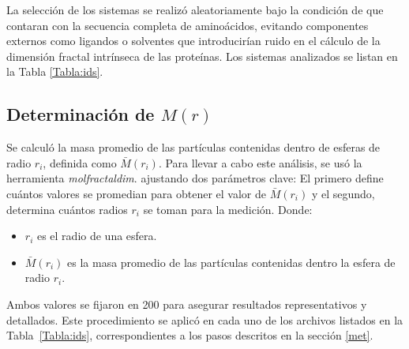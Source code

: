  	La selecci\'{o}n de los sistemas se realiz\'{o} aleatoriamente bajo la condici\'{o}n de que contaran con la secuencia completa de amino\'{a}cidos, evitando componentes externos como ligandos o solventes que introducir\'{i}an ruido en el c\'{a}lculo de la dimensi\'{o}n fractal intr\'{i}nseca de las prote\'{i}nas. Los sistemas analizados se listan en la Tabla \ref{Tabla:ids}.
 
	
	\clearpage
	
	\subsection{Determinaci\'{o}n de $M(r)$}
	
	Se calcul\'{o} la masa promedio de las part\'{i}culas contenidas dentro de esferas de radio $r_i$, definida como $\bar{M}(r_i)$. 
	Para llevar a cabo este an\'{a}lisis, se us\'{o} la herramienta \textit{molfractaldim}. ajustando dos par\'{a}metros clave: El primero define cu\'{a}ntos valores se promedian para obtener el valor de $\bar{M}(r_i)$ y el segundo, determina cu\'{a}ntos radios $r_{i}$ se toman para la medici\'{o}n. Donde: 
	
	\begin{itemize}
		\item $r_{i}$ es el radio de una esfera.
		\item $\bar M(r_{i})$ es la masa promedio de las part\'{i}culas contenidas dentro la esfera de radio $r_{i}$.
	\end{itemize}
	
	
	
	Ambos valores se fijaron en 200 para asegurar resultados representativos y detallados. Este procedimiento se aplic\'{o} en cada uno de los archivos listados en la Tabla~\ref{Tabla:ids}, correspondientes a los pasos descritos en la secci\'{o}n \ref{met}.
	
	

	
